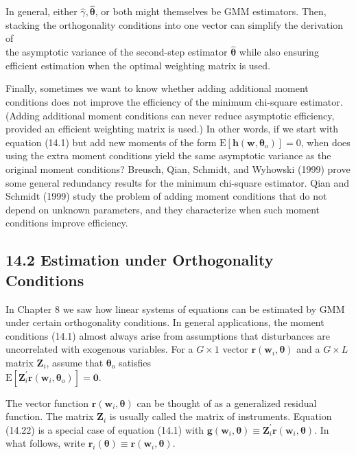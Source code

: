 \documentclass[10pt]{article}
\begin{document}
In general, either $\hat{\gamma}, \hat{\boldsymbol{\theta}}$, or both might themselves be GMM estimators. Then, stacking the orthogonality conditions into one vector can simplify the derivation of\\
the asymptotic variance of the second-step estimator $\hat{\boldsymbol{\theta}}$ while also ensuring efficient estimation when the optimal weighting matrix is used.

Finally, sometimes we want to know whether adding additional moment conditions does not improve the efficiency of the minimum chi-square estimator. (Adding additional moment conditions can never reduce asymptotic efficiency, provided an efficient weighting matrix is used.) In other words, if we start with equation (14.1) but add new moments of the form $\mathrm{E}\left[\mathbf{h}\left(\mathbf{w}, \boldsymbol{\theta}_{\mathrm{o}}\right)\right]=0$, when does using the extra moment conditions yield the same asymptotic variance as the original moment conditions? Breusch, Qian, Schmidt, and Wyhowski (1999) prove some general redundancy results for the minimum chi-square estimator. Qian and Schmidt (1999) study the problem of adding moment conditions that do not depend on unknown parameters, and they characterize when such moment conditions improve efficiency.

\subsection*{14.2 Estimation under Orthogonality Conditions}
In Chapter 8 we saw how linear systems of equations can be estimated by GMM under certain orthogonality conditions. In general applications, the moment conditions (14.1) almost always arise from assumptions that disturbances are uncorrelated with exogenous variables. For a $G \times 1$ vector $\mathbf{r}\left(\mathbf{w}_{i}, \boldsymbol{\theta}\right)$ and a $G \times L$ matrix $\mathbf{Z}_{i}$, assume that $\boldsymbol{\theta}_{\mathrm{o}}$ satisfies\\
$\mathrm{E}\left[\mathbf{Z}_{i}^{\prime} \mathbf{r}\left(\mathbf{w}_{i}, \boldsymbol{\theta}_{\mathrm{o}}\right)\right]=\mathbf{0}$.

The vector function $\mathbf{r}\left(\mathbf{w}_{i}, \boldsymbol{\theta}\right)$ can be thought of as a generalized residual function. The matrix $\mathbf{Z}_{i}$ is usually called the matrix of instruments. Equation (14.22) is a special case of equation (14.1) with $\mathbf{g}\left(\mathbf{w}_{i}, \boldsymbol{\theta}\right) \equiv \boldsymbol{Z}_{i}^{\prime} \mathbf{r}\left(\mathbf{w}_{i}, \boldsymbol{\theta}\right)$. In what follows, write $\mathbf{r}_{i}(\boldsymbol{\theta}) \equiv \mathbf{r}\left(\mathbf{w}_{i}, \boldsymbol{\theta}\right)$.
\end{document}
